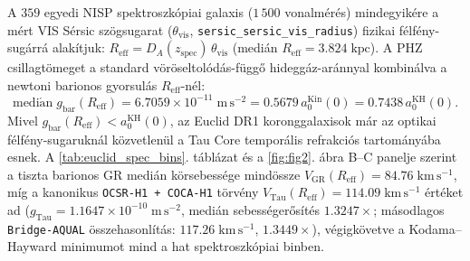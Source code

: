 \documentclass[11pt,a4paper]{article}
\begin{document}
A $359$ egyedi NISP spektroszkópiai galaxis ($1\,500$ vonalmérés) mindegyikére a mért VIS Sérsic szögsugarat ($\theta_{\mathrm{vis}}$, \texttt{sersic\_\allowbreak sersic\_\allowbreak vis\_\allowbreak radius}) fizikai félfény-sugárrá alakítjuk: $R_{\mathrm{eff}} = D_A(z_{\mathrm{spec}})\,\theta_{\mathrm{vis}}$ (medián $R_{\mathrm{eff}} = 3.824\;\mathrm{kpc}$). A PHZ csillagtömeget a standard vöröseltolódás-függő hideggáz-aránnyal kombinálva a newtoni barionos gyorsulás $R_{\mathrm{eff}}$-nél:
\begin{equation}
  \mathrm{medi\acute{a}n}\;g_{\mathrm{bar}}(R_{\mathrm{eff}}) = 6.7059 \times 10^{-11}\;\mathrm{m\,s^{-2}} = 0.5679\,a_0^{\mathrm{Kin}}(0) = 0.7438\,a_0^{\mathrm{KH}}(0).
\end{equation}
Mivel $g_{\mathrm{bar}}(R_{\mathrm{eff}}) < a_0^{\mathrm{KH}}(0)$, az Euclid DR1 koronggalaxisok már az optikai félfény-sugaruknál közvetlenül a Tau Core temporális refrakciós tartományába esnek. A \ref{tab:euclid_spec_bins}. táblázat és a \ref{fig:fig2}. ábra B--C panelje szerint a tiszta barionos GR medián körsebessége mindössze $V_{\mathrm{GR}}(R_{\mathrm{eff}}) = 84.76\;\mathrm{km\,s^{-1}}$, míg a kanonikus \texttt{OCSR-H1 + COCA-H1} törvény $V_{\mathrm{Tau}}(R_{\mathrm{eff}}) = 114.09\;\mathrm{km\,s^{-1}}$ értéket ad ($g_{\mathrm{Tau}} = 1.1647\times 10^{-10}\;\mathrm{m\,s^{-2}}$, medián sebességerősítés $1.3247\times$; másodlagos \texttt{Bridge-AQUAL} összehasonlítás: $117.26\;\mathrm{km\,s^{-1}}$, $1.3449\times$), végigkövetve a Kodama--Hayward minimumot mind a hat spektroszkópiai binben.
\end{document}
